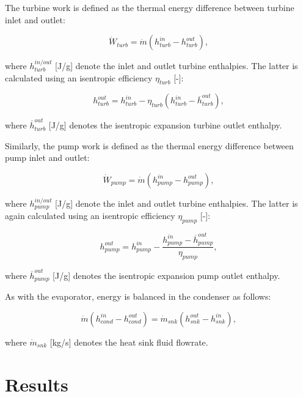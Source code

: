 \documentclass[preprint,12pt]{elsarticle}
\begin{document}
The turbine work is defined as the thermal energy difference between turbine inlet and outlet:

\begin{equation}
\label{turbine}
\dot{W}_{turb} = \dot{m} (h^{in}_{turb}-h^{out}_{turb}),
\end{equation}

where $h^{in/out}_{turb}$ [J/g] denote the inlet and outlet turbine enthalpies. The latter is calculated using an isentropic efficiency $\eta_{turb}$ [-]:

\begin{equation}
\label{turbine_out}
h^{out}_{turb} = h^{in}_{turb}-\eta_{turb} (h^{in}_{turb}-\overline{h}^{out}_{turb}),
\end{equation}

where $\overline{h}^{out}_{turb}$ [J/g] denotes the isentropic expansion turbine outlet enthalpy.

Similarly, the pump work is defined as the thermal energy difference between pump inlet and outlet:

\begin{equation}
\label{pump}
\dot{W}_{pump} = \dot{m} (h^{in}_{pump}-h^{out}_{pump}),
\end{equation}

where $h^{in/out}_{pump}$ [J/g] denote the inlet and outlet turbine enthalpies. The latter is again calculated using an isentropic efficiency $\eta_{pump}$ [-]:

\begin{equation}
\label{pump_out}
h^{out}_{pump} = h^{in}_{pump}- \frac{h^{in}_{pump}-\overline{h}^{out}_{pump}}{\eta_{pump}},
\end{equation}

where $\overline{h}^{out}_{pump}$ [J/g] denotes the isentropic expansion pump outlet enthalpy.

As with the evaporator, energy is balanced in the condenser as follows:

\begin{equation}
\label{conservation}
\dot{m} (h^{in}_{cond}-h^{out}_{cond}) = \dot{m}_{snk}(h^{out}_{snk}-h^{in}_{snk}),
\end{equation}

where $\dot{m}_{snk}$ [kg/s] denotes the heat sink fluid flowrate.

\section{Results}
\label{sec:results}
\end{document}
